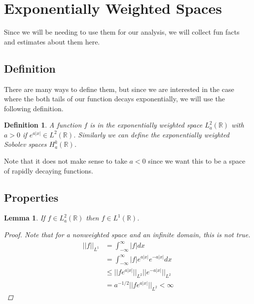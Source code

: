 \documentclass[12pt]{article}
\def\R{{\mathbb R}}
\newtheorem{lemma}{Lemma}
\newtheorem{definition}{Definition}
\begin{document}
\section*{Exponentially Weighted Spaces}

Since we will be needing to use them for our analysis, we will collect fun facts and estimates about them here.

\subsection*{Definition}

There are many ways to define them, but since we are interested in the case where the both tails of our function decays exponentially, we will use the following definition.

\begin{definition}A function $f$ is in the exponentially weighted space $L^2_a(\R)$ with $a > 0$ if $e^{a|x|} \in L^2(\R)$. Similarly we can define the exponentially weighted Sobolev spaces $H^k_a(\R)$.
\end{definition}

Note that it does not make sense to take $a < 0$ since we want this to be a space of rapidly decaying functions.

\subsection*{Properties}

\begin{lemma}If $f \in L^2_a(\R)$ then $f \in L^1(\R)$.
\begin{proof}Note that for a nonweighted space and an infinite domain, this is not true.
\begin{align*}
||f||_{L^1} &= \int_{-\infty}^{\infty}|f|dx \\
&= \int_{-\infty}^{\infty}|f| e^{a|x|} e^{-a|x|} dx \\
&\leq ||f e^{a|x|}||_{L^2} ||e^{-a|x|}||_{L^2} \\
&= a^{-1/2} ||f e^{a|x|}||_{L^2} < \infty
\end{align*}
\end{proof}
\end{lemma}
\end{document}
